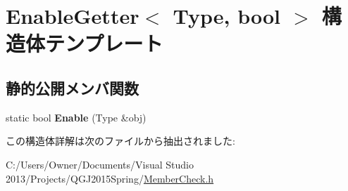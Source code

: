 \hypertarget{struct_enable_getter}{}\section{Enable\+Getter$<$ Type, bool $>$ 構造体テンプレート}
\label{struct_enable_getter}
\subsection*{静的公開メンバ関数}
\begin{DoxyCompactItemize}
\item 
static bool {\bfseries Enable} (Type \&obj)\hypertarget{struct_enable_getter_a9a4edeadbe51cc2326fad9399052b9e0}{}\label{struct_enable_getter_a9a4edeadbe51cc2326fad9399052b9e0}

\end{DoxyCompactItemize}


この構造体詳解は次のファイルから抽出されました\+:\begin{DoxyCompactItemize}
\item 
C\+:/\+Users/\+Owner/\+Documents/\+Visual Studio 2013/\+Projects/\+Q\+G\+J2015\+Spring/\hyperlink{_member_check_8h}{Member\+Check.\+h}\end{DoxyCompactItemize}
